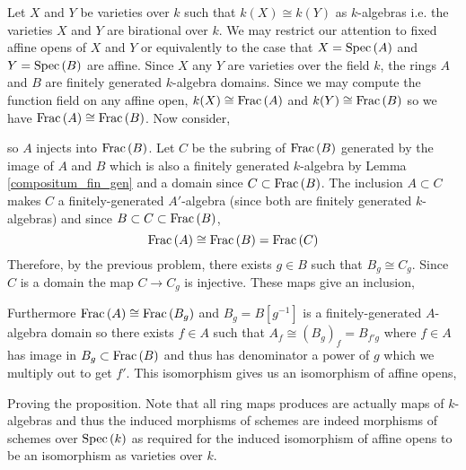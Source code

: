 \documentclass[12pt]{article}
\begin{document}
Let $X$ and $Y$ be varieties over $k$ such that $k(X) \cong k(Y)$ as $k$-algebras i.e. the varieties $X$ and $Y$ are birational over $k$. We may restrict our attention to fixed affine opens of $X$ and $Y$ or equivalently to the case that $X = \mathrm{Spec}\left( A \right)$ and $Y = \mathrm{Spec}\left( B \right)$ are affine. Since $X$ any $Y$ are varieties over the field $k$, the rings $A$ and $B$ are finitely generated $k$-algebra domains. Since we may compute the function field on any affine open, $k(X) \cong \mathrm{Frac}\left(A\right)$ and $k(Y) \cong \mathrm{Frac}\left(B\right)$ so we have $\mathrm{Frac}\left(A\right) \cong \mathrm{Frac}\left(B\right)$. Now consider,
\begin{center}
\end{center}
so $A$ injects into $\mathrm{Frac}\left(B\right)$. Let $C$ be the subring of $\mathrm{Frac}\left(B\right)$ generated by the image of $A$ and $B$ which is also a finitely generated $k$-algebra by Lemma \ref{compositum_fin_gen} and a domain since $C \subset \mathrm{Frac}\left(B\right)$. The inclusion $A \subset C$ makes $C$ a finitely-generated $A'$-algebra (since both are finitely generated $k$-algebras) and since $B \subset C \subset \mathrm{Frac}\left(B\right)$,
\[ \mathrm{Frac}\left(A\right) \cong \mathrm{Frac}\left(B\right) = \mathrm{Frac}\left(C\right)  \] Therefore, by the previous problem, there exists $g \in B$ such that $B_g \cong C_g$. Since $C$ is a domain the map $C \to C_g$ is injective. These maps give an inclusion,
\begin{center}
\end{center}
Furthermore $\mathrm{Frac}\left(A\right) \cong \mathrm{Frac}\left(B_g\right)$ and $B_g = B[g^{-1}]$ is a finitely-generated $A$-algebra domain so there exists $f \in A$ such that $A_f \cong (B_g)_f = B_{f'g}$ where $f \in A$ has image in $B_g \subset \mathrm{Frac}\left(B\right)$ and thus has denominator a power of $g$ which we multiply out to get $f'$. This isomorphism gives us an isomorphism of affine opens,  
\begin{center}
\end{center}
Proving the proposition. Note that all ring maps produces are actually maps of $k$-algebras and thus the induced morphisms of schemes are indeed morphisms of schemes over $\mathrm{Spec}\left( k \right)$ as required for the induced isomorphism of affine opens to be an isomorphism as varieties over $k$.  
\end{document}

